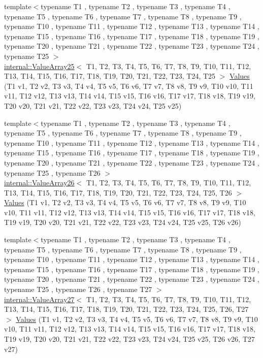 \begin{DoxyCompactItemize}
\item 
{\footnotesize template$<$typename T1 , typename T2 , typename T3 , typename T4 , typename T5 , typename T6 , typename T7 , typename T8 , typename T9 , typename T10 , typename T11 , typename T12 , typename T13 , typename T14 , typename T15 , typename T16 , typename T17 , typename T18 , typename T19 , typename T20 , typename T21 , typename T22 , typename T23 , typename T24 , typename T25 $>$ }\\\mbox{\hyperlink{classtesting_1_1internal_1_1ValueArray25}{internal\+::\+Value\+Array25}}$<$ T1, T2, T3, T4, T5, T6, T7, T8, T9, T10, T11, T12, T13, T14, T15, T16, T17, T18, T19, T20, T21, T22, T23, T24, T25 $>$ \mbox{\hyperlink{namespacetesting_a74baf6524bda9b5799e313541b4816ea}{Values}} (T1 v1, T2 v2, T3 v3, T4 v4, T5 v5, T6 v6, T7 v7, T8 v8, T9 v9, T10 v10, T11 v11, T12 v12, T13 v13, T14 v14, T15 v15, T16 v16, T17 v17, T18 v18, T19 v19, T20 v20, T21 v21, T22 v22, T23 v23, T24 v24, T25 v25)
\item 
{\footnotesize template$<$typename T1 , typename T2 , typename T3 , typename T4 , typename T5 , typename T6 , typename T7 , typename T8 , typename T9 , typename T10 , typename T11 , typename T12 , typename T13 , typename T14 , typename T15 , typename T16 , typename T17 , typename T18 , typename T19 , typename T20 , typename T21 , typename T22 , typename T23 , typename T24 , typename T25 , typename T26 $>$ }\\\mbox{\hyperlink{classtesting_1_1internal_1_1ValueArray26}{internal\+::\+Value\+Array26}}$<$ T1, T2, T3, T4, T5, T6, T7, T8, T9, T10, T11, T12, T13, T14, T15, T16, T17, T18, T19, T20, T21, T22, T23, T24, T25, T26 $>$ \mbox{\hyperlink{namespacetesting_aeca27a322529e5bbd6331e40c810a123}{Values}} (T1 v1, T2 v2, T3 v3, T4 v4, T5 v5, T6 v6, T7 v7, T8 v8, T9 v9, T10 v10, T11 v11, T12 v12, T13 v13, T14 v14, T15 v15, T16 v16, T17 v17, T18 v18, T19 v19, T20 v20, T21 v21, T22 v22, T23 v23, T24 v24, T25 v25, T26 v26)
\item 
{\footnotesize template$<$typename T1 , typename T2 , typename T3 , typename T4 , typename T5 , typename T6 , typename T7 , typename T8 , typename T9 , typename T10 , typename T11 , typename T12 , typename T13 , typename T14 , typename T15 , typename T16 , typename T17 , typename T18 , typename T19 , typename T20 , typename T21 , typename T22 , typename T23 , typename T24 , typename T25 , typename T26 , typename T27 $>$ }\\\mbox{\hyperlink{classtesting_1_1internal_1_1ValueArray27}{internal\+::\+Value\+Array27}}$<$ T1, T2, T3, T4, T5, T6, T7, T8, T9, T10, T11, T12, T13, T14, T15, T16, T17, T18, T19, T20, T21, T22, T23, T24, T25, T26, T27 $>$ \mbox{\hyperlink{namespacetesting_a089ea706f6cdde715d03ab42aa3099d3}{Values}} (T1 v1, T2 v2, T3 v3, T4 v4, T5 v5, T6 v6, T7 v7, T8 v8, T9 v9, T10 v10, T11 v11, T12 v12, T13 v13, T14 v14, T15 v15, T16 v16, T17 v17, T18 v18, T19 v19, T20 v20, T21 v21, T22 v22, T23 v23, T24 v24, T25 v25, T26 v26, T27 v27)

\end{DoxyCompactItemize}
